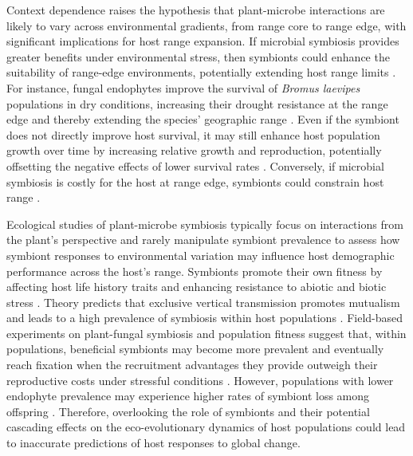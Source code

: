 \documentclass[12pt]{article}\usepackage[]{graphicx}\usepackage[dvipsnames]{xcolor}
\begin{document}
Context dependence raises the hypothesis that plant-microbe interactions are likely to vary across environmental gradients, from range core to range edge, with significant implications for host range expansion. If microbial symbiosis provides greater benefits under environmental stress, then symbionts could enhance the suitability of range-edge environments, potentially extending host range limits \citep{allsup2023shifting,rudgers2020climate}.
For instance, fungal endophytes improve the survival of \emph{Bromus laevipes}  populations in dry conditions, increasing their drought resistance at the range edge and thereby extending the species' geographic range \citep{david2019soil,afkhami2014mutualist}.
Even if the symbiont does not directly improve host survival, it may still enhance host population growth over time by increasing relative growth and reproduction, potentially offsetting the negative effects of lower survival rates \citep{yule2013costs}.
Conversely, if microbial symbiosis is costly for the host at range edge, symbionts could constrain host range \citep{benning2021microbes,benning2021plant,bennett2022costs}.

Ecological studies of plant-microbe symbiosis typically focus on interactions from the plant’s perspective and rarely manipulate symbiont prevalence to assess how symbiont responses to environmental variation may influence host demographic performance across the host's range. 
Symbionts promote their own fitness by affecting host life history traits and enhancing resistance to abiotic and biotic stress \citep{kazenel2015mutualistic, giauque2019endophyte, saikkonen1998fungal}.
Theory predicts that exclusive vertical transmission promotes mutualism and leads to a high prevalence of symbiosis within host populations \citep{fine1975vectors}.
Field-based experiments on plant-fungal symbiosis and population fitness suggest that, within populations, beneficial symbionts may become more prevalent and eventually reach fixation when the recruitment advantages they provide outweigh their reproductive costs under stressful conditions \citep{donald2021context}.
However, populations with lower endophyte prevalence may experience higher rates of symbiont loss among offspring \citep{afkhami2008symbiosis}. 
Therefore, overlooking the role of symbionts and their potential cascading effects on the eco-evolutionary dynamics of host populations could lead to inaccurate predictions of host responses to global change.
\end{document}

